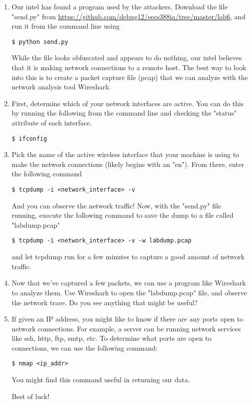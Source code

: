\documentclass[letterpaper,12pt]{article}
\begin{document}
\begin{enumerate}

\item Our intel has found a program used by the attackers. Download the file "send.py" from \url{https://github.com/debug12/eecs388ia/tree/master/lab6}, and run it from the command line using 

\begin{verbatim}
$ python send.py
\end{verbatim}

While the file looks obfuscated and appears to do nothing, our intel believes that it is making network connections to a remote host. The best way to look into this is to create a packet capture file (pcap) that we can analyze with the network analysis tool Wireshark.

\item First, determine which of your network interfaces are active. You can do this by running the following from the command line and checking the "status" attribute of each interface.

\begin{verbatim}
$ ifconfig
\end{verbatim}

\item Pick the name of the active wireless interface that your machine is using to make the network connections (likely begins with an "en"). From there, enter the following command

\begin{verbatim}
$ tcpdump -i <network_interface> -v
\end{verbatim}

And you can observe the network traffic! Now, with the "send.py" file running, execute the following command to save the dump to a file called "labdump.pcap"

\begin{verbatim}
$ tcpdump -i <network_interface> -v -w labdump.pcap
\end{verbatim}

and let tcpdump run for a few minutes to capture a good amount of network traffic.

\item Now that we've captured a few packets, we can use a program like Wireshark to analyze them. Use Wireshark to open the "labdump.pcap" file, and observe the network trace. Do you see anything that might be useful?

\item If given an IP address, you might like to know if there are any ports open to network connections. For example, a server can be running network services like ssh, http, ftp, smtp, etc. To determine what ports are open to connections, we can use the following command:

\begin{verbatim}
$ nmap <ip_addr>
\end{verbatim}

You might find this command useful in returning our data.

Best of luck!

\end{enumerate}
\end{document}
